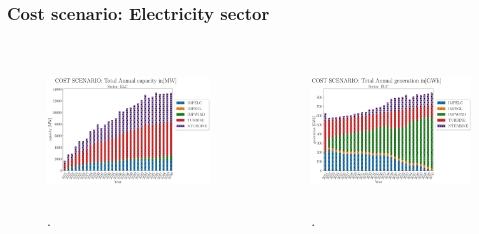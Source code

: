 \begin{frame}
  \frametitle{Cost scenario: Electricity sector}
  \begin{columns}
	  \column[t]{5cm}
  		\begin{figure}[htbp!]
    			\begin{center}
            \includegraphics[height=4cm]{./images/cost scenario_elc_capacity.png}
          \end{center}
          \caption{.}
          \label{fig:cost-elc-cap}
      \end{figure}
    \column[t]{5cm}
        \begin{figure}[htbp!]
          \begin{center}
            \includegraphics[height=4cm]{./images/cost scenario_elc_generation.png}
          \end{center}
          \caption{.}
          \label{fig:cost-elc-gen}
        \end{figure}
    \end{columns}
\end{frame}
